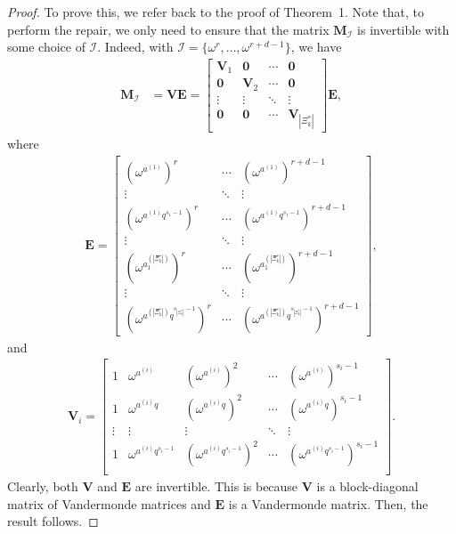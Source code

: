 \documentclass[onecolumn]{IEEEtran}
\theoremstyle{plain}
\theoremstyle{definition}
\newcommand{\cI}{\mathcal{I}}
\begin{document}
\begin{proof}
    To prove this, we refer back to the proof of Theorem~1. Note that, to perform the repair, we only need to ensure that the matrix $\boldsymbol{M}_\cI$ is invertible with some choice of $\cI$. Indeed, with $\cI = \{\omega^r,\ldots,\omega^{r+d-1}\}$, we have
    \begin{align*}
    \boldsymbol{M}_\cI&= \boldsymbol{VE} = \begin{bmatrix}
        \boldsymbol{V}_1 &\boldsymbol{0} & \cdots & \boldsymbol{0}\\
        \boldsymbol{0} & \boldsymbol{V}_2 & \cdots & \boldsymbol{0}\\
        \vdots & \vdots & \ddots & \vdots\\
        \boldsymbol{0} & \boldsymbol{0} & \cdots & \boldsymbol{V}_{|\Xi_k^*|}
    \end{bmatrix}\boldsymbol{E},
    \end{align*}
    where
    \begin{align*}
    \boldsymbol{E} = \begin{bmatrix}
        \left(\omega^{a^{(1)}}\right)^r & \cdots & \left(\omega^{a^{(1)}}\right)^{r+d-1}\\
        \vdots & \ddots & \vdots \\
        \left(\omega^{a^{(1)}q^{s_1-1}}\right)^r & \cdots & \left(\omega^{a^{(1)}q^{s_1-1}}\right)^{r+d-1}\\
        \vdots & \ddots & \vdots\\
        \left(\omega^{a_{1}^{(|\Xi_k^*|)}}\right)^r & \cdots & \left(\omega^{a_{1}^{(|\Xi_k^*|)}}\right)^{r+d-1}\\
        \vdots & \ddots & \vdots \\
        \left(\omega^{a^{(|\Xi_k^*|)}q^{s_{|\Xi_k^*|}-1}}\right)^r & \cdots & \left(\omega^{a^{(|\Xi_k^*|)}q^{s_{|\Xi_k^*|}-1}}\right)^{r+d-1}
    \end{bmatrix},
    \end{align*}
    and
    \begin{align*}
        \boldsymbol{V}_i = \begin{bmatrix}
            1 & \omega^{a^{(i)}} & \left(\omega^{a^{(i)}}\right)^2 & \cdots & \left(\omega^{a^{(i)}}\right)^{s_i-1}\\
            1 & \omega^{a^{(i)}q} & \left(\omega^{a^{(i)}q}\right)^2 & \cdots & \left(\omega^{a^{(i)}q}\right)^{s_i-1}\\
            \vdots & \vdots & \vdots & \ddots & \vdots\\
            1 & \omega^{a^{(i)}q^{s_i-1}} & \left(\omega^{a^{(i)}q^{s_i-1}}\right)^2 & \cdots & \left(\omega^{a^{(i)}q^{s_i-1}}\right)^{s_i-1}\\
        \end{bmatrix}. 
    \end{align*}
    Clearly, both $\boldsymbol{V}$ and $\boldsymbol{E}$ are invertible. This is because $\boldsymbol{V}$ is a block-diagonal matrix of Vandermonde matrices and $\boldsymbol{E}$ is a Vandermonde matrix. Then, the result follows. 
\end{proof}
\end{document}
